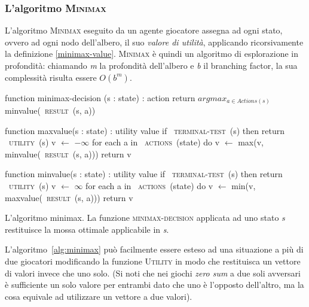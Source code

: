 %
%
%
%

\subsubsection*{L'algoritmo \textsc{Minimax}}

L'algoritmo \textsc{Minimax} eseguito da un agente giocatore assegna ad ogni stato, ovvero ad ogni nodo dell'albero, il suo \emph{valore di utilità}, applicando ricorsivamente la definizione \ref{minimax-value}.
\textsc{Minimax} è quindi un algoritmo di esplorazione in profondità: chiamando \emph{m} la profondità dell'albero e \emph{b} il branching factor, la sua complessità risulta essere $O(b^m)$.





\begin{algorithm}
\begin{PseudoCode}[mathescape,escapechar=~]
function minimax-decision (s : state) : action
   return $argmax_{a \in Actions(s)}$ minvalue(~\textsc{result}~(s, a))

function maxvalue(s : state) : utility value
   if ~\textsc{terminal-test}~(s) then return ~\textsc{utility}~(s)
   v $ \leftarrow $ $ - \infty $
   for each a in ~\textsc{actions}~(state) do
      v $ \leftarrow $ max(v, minvalue(~\textsc{result}~(s, a)))
   return v
   
function minvalue(s : state) : utility value
   if ~\textsc{terminal-test}~(s) then return ~\textsc{utility}~(s)
   v $ \leftarrow $ $ \infty $
   for each a in ~\textsc{actions}~(state) do
      v $ \leftarrow $ min(v, maxvalue(~\textsc{result}~(s, a)))
   return v
\end{PseudoCode}
\caption{L'algoritmo minimax. La funzione \textsc{minimax-decision} applicata ad uno stato \emph{s} restituisce la mossa ottimale applicabile in \emph{s}. \cite{randw}}
\label{alg:minimax}
\end{algorithm}

L'algoritmo~\ref{alg:minimax} può facilmente essere esteso ad una situazione a più di due giocatori modificando la funzione \textsc{Utility} in modo che restituisca un vettore di valori invece che uno solo.
(Si noti che nei giochi \emph{zero sum} a due soli avversari è sufficiente un solo valore per entrambi dato che uno è l'opposto dell'altro, ma la cosa equivale ad utilizzare un vettore a due valori).

